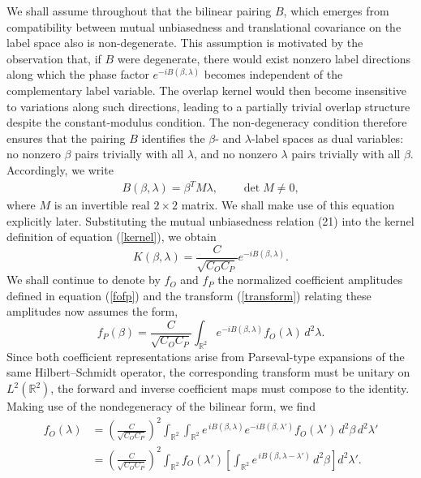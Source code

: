 \documentclass[aps,pra,onecolumn,nofootinbib,superscriptaddress,showpacs]{revtex4}
\begin{document}
We shall assume throughout that the bilinear pairing \(B\), which emerges from compatibility between mutual unbiasedness and translational covariance on the label space also is non-degenerate. This assumption is motivated by the
observation that, if \(B\) were degenerate, there would
exist nonzero label directions along which the phase factor
\(e^{-iB(\beta,\lambda)}\) becomes independent of the
complementary label variable. The overlap kernel would then
become insensitive to variations along such directions,
leading to a partially trivial overlap structure despite
the constant-modulus condition. The non-degeneracy
condition therefore ensures that the pairing \(B\)
identifies the \(\beta\)- and \(\lambda\)-label spaces as
dual variables: no nonzero \(\beta\) pairs trivially with
all \(\lambda\), and no nonzero \(\lambda\) pairs
trivially with all \(\beta\). Accordingly, we write
\begin{eqnarray}\label{B}
B(\beta,\lambda)=\beta^{T}M\lambda,
\qquad
\det M\neq 0,
\end{eqnarray}
where \(M\) is an invertible real \(2\times2\) matrix. We shall make use of this equation explicitly  later.
Substituting the mutual unbiasedness relation (21) into the kernel definition of equation (\ref{kernel}), we obtain
\begin{equation}
K(\beta,\lambda)
=
\frac{C}{\sqrt{C_O C_P}}
e^{-iB(\beta,\lambda)}.
\end{equation}
%
We shall continue to denote by $f_O$ and $f_P$ the normalized coefficient amplitudes defined in equation (\ref{fofp}) and the transform (\ref{transform}) relating these amplitudes now assumes the form, 
\begin{equation}
f_P(\beta)
=
\frac{C}{\sqrt{C_O C_P}}
\int_{\mathbb R^2}
e^{-iB(\beta,\lambda)}
f_O(\lambda)\, d^2\lambda .
\label{eq:BFourier}
\end{equation}
%
Since both coefficient representations arise from Parseval-type expansions of the same Hilbert--Schmidt operator, the corresponding transform must be unitary on $L^2(\mathbb R^2)$, the forward and inverse coefficient maps must compose to the identity. Making use of the nondegeneracy of the bilinear form, we find
\begin{align}
f_O(\lambda)
&=
\left(
\frac{C}{\sqrt{C_O C_P}}
\right)^2
\int_{\mathbb R^2}
\int_{\mathbb R^2}
e^{\,iB(\beta,\lambda)}
e^{-iB(\beta,\lambda')}
f_O(\lambda')
\, d^2\beta\, d^2\lambda'
\nonumber\\
&=
\left(
\frac{C}{\sqrt{C_O C_P}}
\right)^2
\int_{\mathbb R^2}
f_O(\lambda')
\left[
\int_{\mathbb R^2}
e^{\,iB(\beta,\lambda-\lambda')}
\, d^2\beta
\right]
d^2\lambda'.
\end{align}
\end{document}
